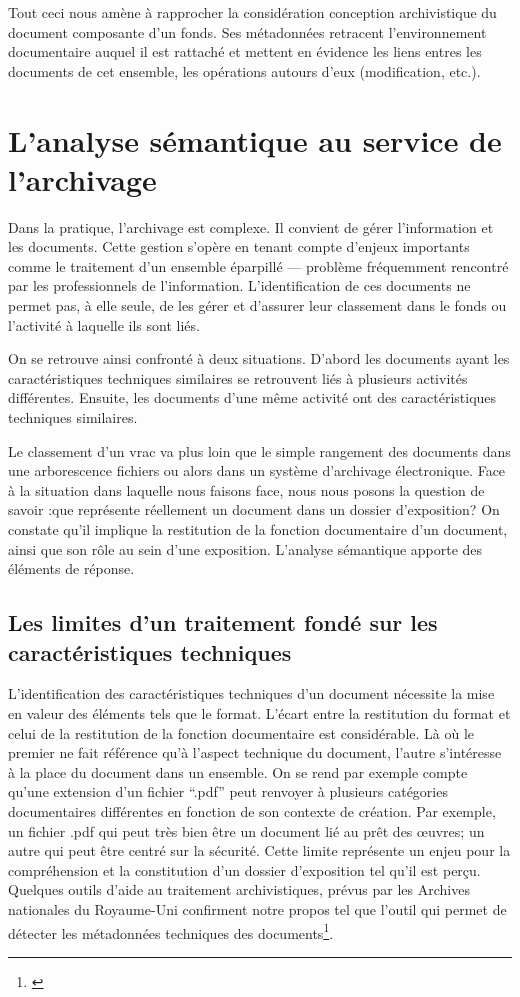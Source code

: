 Tout ceci nous amène à rapprocher la considération conception archivistique du document composante d'un fonds. Ses métadonnées retracent l'environnement documentaire auquel il est rattaché et mettent en évidence les liens entres les documents de cet ensemble, les opérations autours d'eux (modification, etc.).

\section{L'analyse sémantique au service de l'archivage}

Dans la pratique, l’archivage est complexe. Il convient de gérer l'information et les documents.  Cette gestion s’opère en tenant compte d’enjeux importants comme le traitement d'un ensemble éparpillé — problème fréquemment rencontré par les professionnels de l'information. L'identification de ces documents ne permet pas, à elle seule, de les gérer et d'assurer leur classement dans le fonds ou l'activité à laquelle ils sont liés. 

On se retrouve ainsi confronté à deux situations. D'abord les documents ayant les caractéristiques techniques similaires se retrouvent liés à plusieurs activités différentes. Ensuite, les documents d'une même activité ont des caractéristiques techniques similaires. 

Le classement d'un vrac va plus loin que le simple rangement des documents dans une arborescence fichiers ou alors dans un système d'archivage électronique. Face à la situation dans laquelle nous faisons face, nous nous posons la question de savoir :que représente réellement un document dans un dossier d'exposition? 
On constate qu'il implique la restitution de la fonction documentaire d'un document, ainsi que son rôle au sein d'une exposition. L'analyse sémantique apporte des éléments de réponse. 


\subsection*{Les limites d’un traitement fondé sur les caractéristiques techniques}

L'identification des caractéristiques techniques d'un document nécessite la mise en valeur des éléments tels que le format. L'écart entre la restitution du format et celui de la restitution de la fonction documentaire est considérable. Là où le premier ne fait référence qu'à l'aspect technique du document, l'autre s’intéresse à la place du document dans un ensemble. On se rend par exemple compte qu'une extension d'un fichier \enquote{.pdf}  peut renvoyer à  plusieurs catégories documentaires différentes en fonction de son contexte de création. Par exemple, un fichier .pdf qui peut très bien être un document lié au prêt des œuvres; un autre qui peut être centré sur la sécurité. Cette limite représente un enjeu pour la compréhension et la constitution d'un dossier d'exposition tel qu'il est perçu. Quelques outils d'aide au traitement archivistiques, prévus par les Archives nationales du Royaume-Uni confirment notre propos tel que l'outil qui permet de détecter les métadonnées techniques des documents\footnote{\cite{national-archives-droid}}. 



